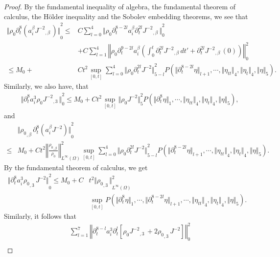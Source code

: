 \documentclass[12pt,twoside,reqno]{amsart}
\numberwithin{equation}{section}
\theoremstyle{definition}
\theoremstyle{remark}
\begin{document}
\begin{proof}
By the fundamental inequality of algebra, the fundamental theorem of calculus, the H\"older inequality and the Sobolev embedding theorems, we see that
\begin{align*}
  {\Vert{{\rho_0}  {\partial}_t^8(a_i^\beta{{{J^{-2}}}_{,{\beta}}\,})}\Vert}_0^2
  {\leqslant}&C\sum_{l=0}^4{\Vert{{\rho_0}  {\partial}_t^{8-2l} a_i^\beta {\partial}_t^{2l}{{{J^{-2}}}_{,{\beta}}\,}}\Vert}_0^2\\
  &+C\sum_{l=1}^4{\left\Vert{{\rho_0}  {\partial}_t^{9-2l} a_i^\beta \left(\int_0^t{\partial}_t^{2l}{{{J^{-2}}}_{,{\beta}}\,}dt' +{\partial}_t^{2l}{{{J^{-2}}}_{,{\beta}}\,}(0)\right)}\right\Vert}_0^2\\
  {\leqslant} M_0+&Ct^2\sup_{[0,t]}\sum_{l=0}^4{\Vert{{\rho_0}  {\partial}_t^{2l}J^{-2}}\Vert}_{5-l}^2 P({\Vert{{\partial}_t^{8-2l}\eta}\Vert}_{l+1},\cdots,{\Vert{\eta_{tt}}\Vert}_4, {\Vert{\eta_t}\Vert}_4,{\Vert{\eta}\Vert}_5).
\end{align*}
Similarly, we also have, that
\begin{align*}
  &{\Vert{{\partial}_t^8 a_i^3 {\rho_0}  {{{J^{-2}}}_{,{3}}\,}}\Vert}_0^2
  {\leqslant} M_0+Ct^2\sup_{[0,t]}{\Vert{{\rho_0} J^{-2}}\Vert}_{5}^2 P({\Vert{{\partial}_t^{8}\eta}\Vert}_{1},\cdots,{\Vert{\eta_{tt}}\Vert}_4, {\Vert{\eta_t}\Vert}_4,{\Vert{\eta}\Vert}_5),
\end{align*}
and
\begin{align*}
  &{\Vert{ {{\rho_0}_{,{\beta}}\,} {\partial}_t^8(a_i^\beta J^{-2})}\Vert}_0^2\\
  {\leqslant}&M_0+Ct^2{\left\Vert{\frac{{{\rho_0}_{,{\beta}}\,}}{\rho_0}}\right\Vert}_{L^\infty(\Omega)}^2\sup_{[0,t]}\sum_{l=0}^4 {\Vert{{\rho_0}  {\partial}_t^{2l}J^{-2}}\Vert}_{5-l}^2  P({\Vert{{\partial}_t^{8-2l}\eta}\Vert}_{l+1},\cdots,{\Vert{\eta_{tt}}\Vert}_4, {\Vert{\eta_t}\Vert}_4,{\Vert{\eta}\Vert}_5).
\end{align*}
By the fundamental theorem of calculus, we get
\begin{align*}
{\Vert{{\partial}_t^8 a_i^3 {{\rho_0}_{,{3}}\,}J^{-2}}\Vert}_0^2
  {\leqslant} M_0+C&t^2{\Vert{{{\rho_0}_{,{3}}\,}}\Vert}_{L^\infty(\Omega)}^2 \\
  &\sup_{[0,t]}P({\Vert{{\partial}_t^{8}\eta}\Vert}_{1},\cdots, {\Vert{{\partial}_t^{8-2l}\eta}\Vert}_{l+1},\cdots, {\Vert{\eta_{tt}}\Vert}_4, {\Vert{\eta_t}\Vert}_4,{\Vert{\eta}\Vert}_5).
\end{align*}
Similarly, it follows that
\begin{align*}
  &\sum_{l=1}^7{\left\Vert{{\partial}_t^{8-l} a_i^3{\partial}_t^l\left[ {\rho_0}  {{{J^{-2}}}_{,{3}}\,}+2 {{\rho_0}_{,{3}}\,}J^{-2}\right]}\right\Vert}_0^2\\

\end{align*}
\end{proof}
\end{document}

